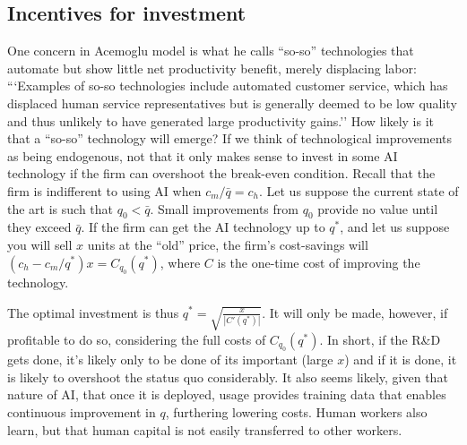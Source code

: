 \documentclass{article}
\begin{document}

\subsection{Incentives for investment}
One concern in Acemoglu model is what he calls ``so-so'' technologies that automate but show little net productivity benefit, merely displacing labor: ```Examples of so-so technologies include automated customer service, which has displaced human service representatives but is generally deemed to be low quality and thus unlikely to have generated large productivity gains.''
How likely is it that a ``so-so'' technology will emerge?
If we think of technological improvements as being endogenous, not that it only makes sense to invest in some AI technology if the firm can overshoot the break-even condition. 
Recall that the firm is indifferent to using AI when $c_m / \bar{q} = c_h$. 
Let us suppose the current state of the art is such that $q_0 < \bar{q}$.
Small improvements from $q_0$ provide no value until they exceed $\bar{q}$. 
If the firm can get the AI technology up to $q^*$, and let us suppose you will sell $x$ units at the ``old'' price, 
the firm's cost-savings will $(c_h - c_m / q^*) x = C_{q_0}(q^*)$, where $C$ is the one-time cost of improving the technology.

The optimal investment is thus $q^* = \sqrt{\frac{x}{|C'(q^*)|}}$.
It will only be made, however, if profitable to do so, considering the full costs of $C_{q_0}(q^*)$.
In short, if the R\&D gets done, it's likely only to be done of its important (large $x$) and if it is done, it is likely to overshoot the status quo considerably.  
It also seems likely, given that nature of AI, that once it is deployed, usage provides training data that enables continuous improvement in $q$, furthering lowering costs. 
Human workers also learn, but that human capital is not easily transferred to other workers. 
\end{document}
